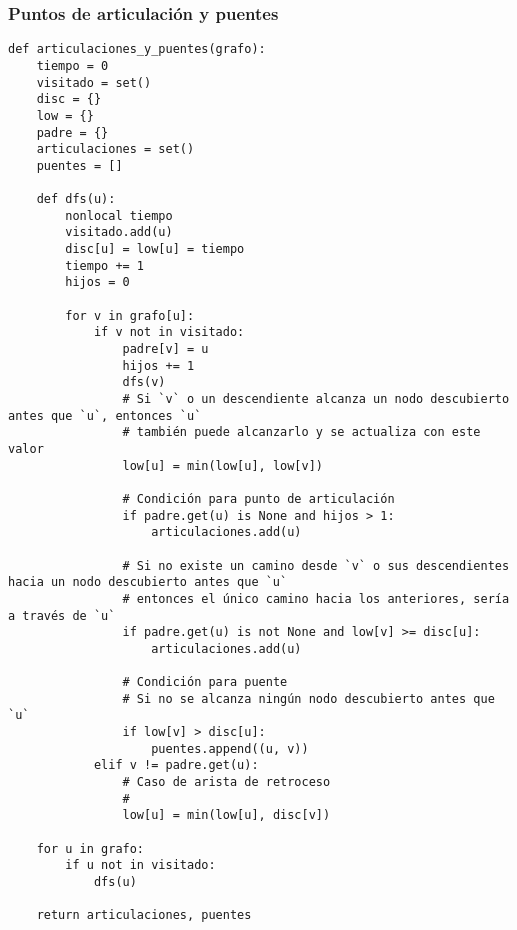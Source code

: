 \documentclass[12pt,letterpaper]{article}
\begin{document}
\subsubsection{Puntos de articulación y puentes}

\begin{verbatim}
def articulaciones_y_puentes(grafo):
    tiempo = 0
    visitado = set()
    disc = {}
    low = {}
    padre = {}
    articulaciones = set()
    puentes = []

    def dfs(u):
        nonlocal tiempo
        visitado.add(u)
        disc[u] = low[u] = tiempo
        tiempo += 1
        hijos = 0

        for v in grafo[u]:
            if v not in visitado:
                padre[v] = u
                hijos += 1
                dfs(v)
                # Si `v` o un descendiente alcanza un nodo descubierto antes que `u`, entonces `u`
                # también puede alcanzarlo y se actualiza con este valor
                low[u] = min(low[u], low[v])

                # Condición para punto de articulación
                if padre.get(u) is None and hijos > 1:
                    articulaciones.add(u)

                # Si no existe un camino desde `v` o sus descendientes hacia un nodo descubierto antes que `u`
                # entonces el único camino hacia los anteriores, sería a través de `u`
                if padre.get(u) is not None and low[v] >= disc[u]:
                    articulaciones.add(u)

                # Condición para puente
                # Si no se alcanza ningún nodo descubierto antes que `u`
                if low[v] > disc[u]:
                    puentes.append((u, v))
            elif v != padre.get(u):
                # Caso de arista de retroceso
                #
                low[u] = min(low[u], disc[v])

    for u in grafo:
        if u not in visitado:
            dfs(u)

    return articulaciones, puentes
\end{verbatim}
\end{document}
